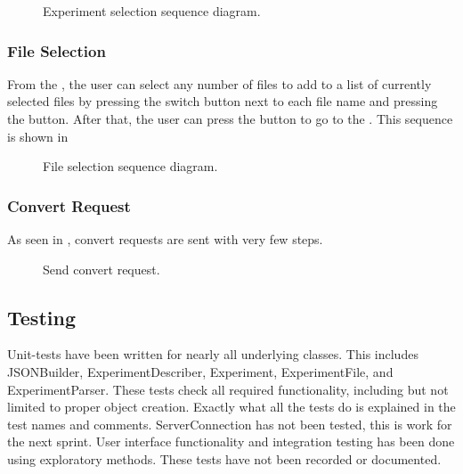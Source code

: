 \begin{figure}[ht]
\caption{Experiment selection sequence diagram.}
\label{fig:ios_sequence_experiment_selection}
\end{figure}

\subsubsection{File Selection}

From the , the user can select any number of files to add to a list of currently selected files by pressing the switch button next to each file name and pressing the  button. After that, the user can press the  button to go to the . This sequence is shown in 

\begin{figure}[ht]
\caption{File selection sequence diagram.}
\label{fig:ios_sequence_file_selection}
\end{figure}

\subsubsection{Convert Request}

As seen in , convert requests are sent with very few steps. 

\begin{figure}[ht]
\caption{Send convert request.}
\label{fig:ios_sequence_convert_request}
\end{figure}

\FloatBarrier

\subsection{Testing}

Unit-tests have been written for nearly all underlying classes. This includes JSONBuilder, ExperimentDescriber, Experiment, ExperimentFile, and ExperimentParser. These tests check all required functionality, including but not limited to proper object creation. Exactly what all the tests do is explained in the test names and comments. ServerConnection has not been tested, this is work for the next sprint. User interface functionality and integration testing has been done using exploratory methods. These tests have not been recorded or documented.